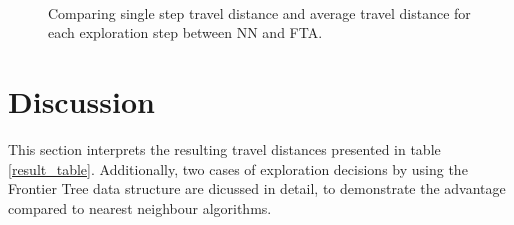 \documentclass[twocolumn]{svjour3}[2016]
\begin{document}
\begin{figure}
\centering
  \mbox{
  }
  \caption{Comparing single step travel distance and average travel distance for each exploration step between NN and FTA.}
  \label{fig6}
\end{figure}

\section{Discussion}
This section interprets the resulting travel distances presented in table \ref{result_table}. Additionally, two cases of exploration decisions by using the Frontier Tree data structure are dicussed in detail, to demonstrate the advantage compared to nearest neighbour algorithms.\\
\end{document}
